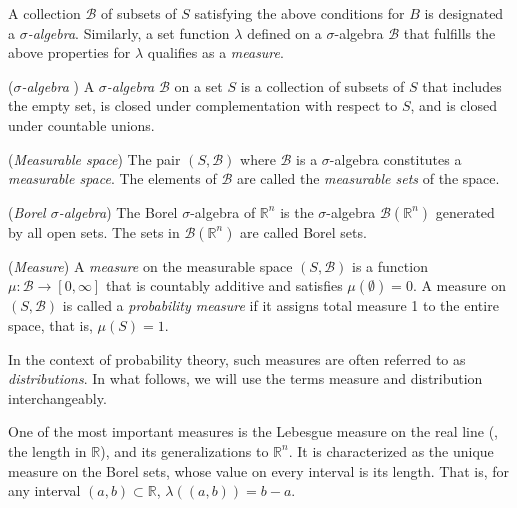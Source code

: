 A collection $\mathcal{B}$ of subsets of $S$ satisfying the above conditions for $B$ is designated a $\sigma$\emph{-algebra}. Similarly, a set function $\lambda$ defined on a $\sigma$-algebra $\mathcal{B}$ that fulfills the above properties for $\lambda$ qualifies as a \emph{measure}.

\begin{definition} ($\sigma$\emph{-algebra} )
  A $\sigma$\emph{-algebra} $\mathcal{B}$ on a set $S$ is a collection of subsets of $S$ that includes the empty set, is closed under complementation with respect to $S$, and is closed under countable unions. 
\end{definition}

\begin{definition} (\emph{Measurable space})
  The pair $(S, \mathcal{B})$ where $\mathcal{B}$ is a $\sigma$-algebra constitutes a \emph{measurable space}. The elements of $\mathcal{B}$ are called  the \emph{measurable sets} of the space. 
\end{definition}

\begin{definition}  (\emph{Borel $\sigma$-algebra})
   The Borel $\sigma$-algebra of $\mathbb{R}^n$ is the $\sigma$-algebra $\mathcal{B}(\mathbb{R}^n)$ generated by all open sets. The sets in $\mathcal{B}(\mathbb{R}^n)$ are called Borel sets. %
\end{definition}


\begin{definition} (\emph{Measure})
  A  \emph{measure} on the measurable space $(S,\mathcal{B})$ is a function $\mu: \mathcal{B} \to  [0,\infty] $ that is countably additive and satisfies $\mu(\emptyset)=0$. A measure  on $(S,\mathcal{B})$ is called a \emph{probability measure} if it assigns total measure 1 to the entire space, that is, $\mu(S) = 1$.
\end{definition}

 In the context of probability theory, such measures are often referred to as \emph{distributions}. In what follows, we will use the terms measure and distribution interchangeably.

 

 One of the most important measures is the Lebesgue measure on the real line (\ie, the length in $\mathbb{R}$), and its generalizations to $\mathbb{R}^n$.  It is characterized as the unique measure on the Borel sets, whose value on every interval is its length. That is, for any interval $(a, b) \subset \mathbb{R}$,
$
\lambda((a, b)) = b - a.$

